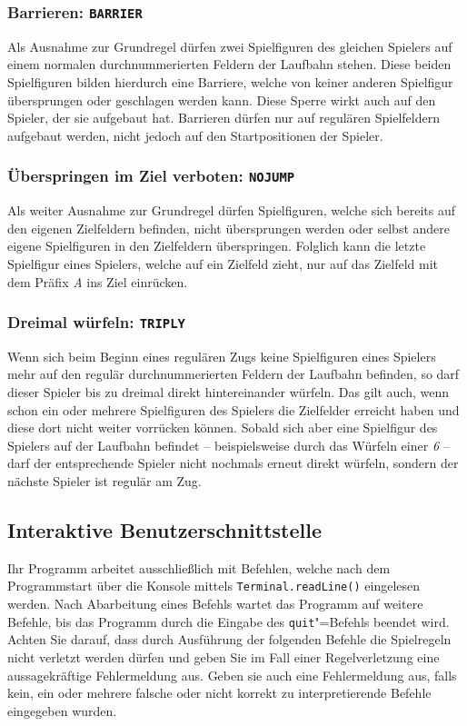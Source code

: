 \subsubsection*{Barrieren: \texttt{BARRIER}} 
Als Ausnahme zur Grundregel dürfen zwei Spielfiguren des gleichen Spielers auf einem normalen durchnummerierten Feldern der Laufbahn stehen. Diese beiden Spielfiguren bilden hierdurch eine Barriere, welche von keiner anderen Spielfigur übersprungen oder geschlagen werden kann. Diese Sperre wirkt auch auf den Spieler, der sie aufgebaut hat. Barrieren dürfen nur auf regulären Spielfeldern aufgebaut werden, nicht jedoch auf den Startpositionen der Spieler.

\subsubsection*{Überspringen im Ziel verboten: \texttt{NOJUMP}} 
Als weiter Ausnahme zur Grundregel dürfen Spielfiguren, welche sich bereits auf den eigenen Zielfeldern befinden, nicht übersprungen werden oder selbst andere eigene Spielfiguren in den Zielfeldern überspringen. Folglich kann die letzte Spielfigur eines Spielers, welche auf ein Zielfeld zieht, nur auf das Zielfeld mit dem Präfix \emph{A} ins Ziel einrücken.

\subsubsection*{Dreimal würfeln: \texttt{TRIPLY}}
Wenn sich beim Beginn eines regulären Zugs keine Spielfiguren eines Spielers mehr auf den regulär durchnummerierten Feldern der Laufbahn befinden, so darf dieser Spieler bis zu dreimal direkt hintereinander würfeln. Das gilt auch, wenn schon ein oder mehrere Spielfiguren des Spielers die Zielfelder erreicht haben und diese dort nicht weiter vorrücken können. Sobald sich aber eine Spielfigur des Spielers auf der Laufbahn befindet -- beispielsweise durch das Würfeln einer \emph{6} -- darf der entsprechende Spieler nicht nochmals erneut direkt würfeln, sondern der nächste Spieler ist regulär am Zug.

\subsection*{Interaktive Benutzerschnittstelle}
Ihr Programm arbeitet ausschließlich mit Befehlen, welche nach dem Programmstart über die Konsole mittels \texttt{Terminal.readLine()} eingelesen werden. Nach Abarbeitung eines Befehls wartet das Programm auf weitere Befehle, bis das Programm durch die Eingabe des \texttt{quit}"=Befehls beendet wird. Achten Sie darauf, dass durch Ausführung der folgenden Befehle die Spielregeln nicht verletzt werden dürfen und geben Sie im Fall einer Regelverletzung eine aussagekräftige Fehlermeldung aus. Geben sie auch eine Fehlermeldung aus, falls kein, ein oder mehrere falsche oder nicht korrekt zu interpretierende Befehle eingegeben wurden.

